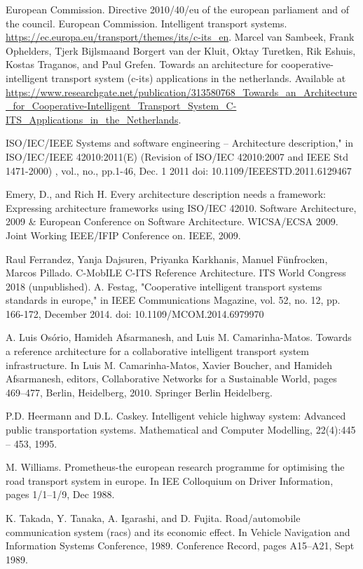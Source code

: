 \documentclass[conference]{IEEEtran}
\begin{document}
\begin{thebibliography}{00}

     European Commission. Directive 2010/40/eu of the european parliament and of the council.
     European Commission. Intelligent transport systems. \url{https://ec.europa.eu/transport/themes/its/c-its_en}.
     Marcel van Sambeek, Frank Ophelders, Tjerk Bijlsmaand Borgert van der Kluit, Oktay Turetken, Rik Eshuis, Kostas Traganos, and Paul Grefen. Towards an architecture for cooperative-intelligent transport system (c-its) applications in the netherlands. Available at \url{ https://www.researchgate.net/publication/313580768_Towards_an_Architecture_for_Cooperative-Intelligent_Transport_System_C-ITS_Applications_in_the_Netherlands}.

     ISO/IEC/IEEE Systems and software engineering -- Architecture description," in ISO/IEC/IEEE 42010:2011(E) (Revision of ISO/IEC 42010:2007 and IEEE Std 1471-2000) , vol., no., pp.1-46, Dec. 1 2011 doi: 10.1109/IEEESTD.2011.6129467
    
    Emery, D., and Rich H. Every architecture description needs a framework: Expressing architecture frameworks using ISO/IEC 42010. Software Architecture, 2009 \& European Conference on Software Architecture. WICSA/ECSA 2009. Joint Working IEEE/IFIP Conference on. IEEE, 2009.
    
    Raul Ferrandez, Yanja Dajsuren, Priyanka Karkhanis, Manuel Fünfrocken, Marcos Pillado. C-MobILE C-ITS Reference Architecture. ITS World Congress 2018 (unpublished).
    A. Festag, "Cooperative intelligent transport systems standards in europe," in IEEE Communications Magazine, vol. 52, no. 12, pp. 166-172, December 2014.  doi: 10.1109/MCOM.2014.6979970
    
     A. Luis Osório, Hamideh Afsarmanesh, and Luis M. Camarinha-Matos. Towards a reference architecture
    for a collaborative intelligent transport system infrastructure. In Luis M. Camarinha-Matos, Xavier Boucher, and Hamideh Afsarmanesh, editors, Collaborative Networks for a Sustainable
    World, pages 469–477, Berlin, Heidelberg, 2010. Springer Berlin Heidelberg.
    
     P.D. Heermann and D.L. Caskey. Intelligent vehicle highway system: Advanced public transportation
    systems. Mathematical and Computer Modelling, 22(4):445 – 453, 1995.
    
     M. Williams. Prometheus-the european research programme for optimising the road transport
    system in europe. In IEE Colloquium on Driver Information, pages 1/1–1/9, Dec 1988.
    
     K. Takada, Y. Tanaka, A. Igarashi, and D. Fujita. Road/automobile communication system
    (racs) and its economic effect. In Vehicle Navigation and Information Systems Conference,
    1989. Conference Record, pages A15–A21, Sept 1989.
\end{thebibliography}
\end{document}
